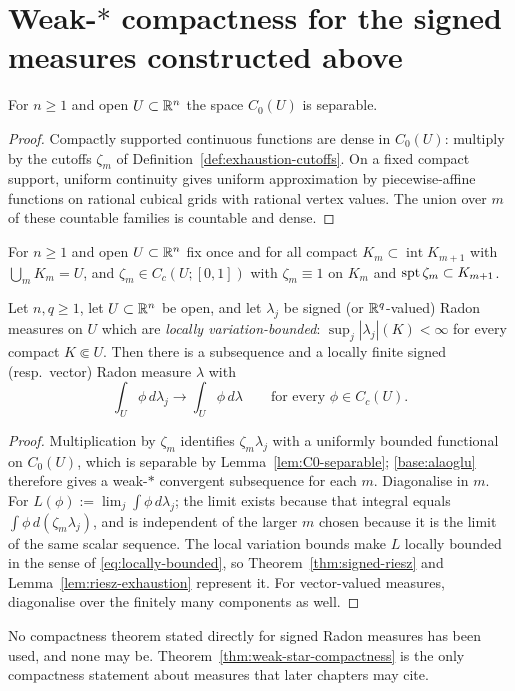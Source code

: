 \section{Weak-$*$ compactness for the signed measures constructed above}
\label{sec:signed-compactness}

\begin{lemma}[$C_0(U)$ is separable]\label{lem:C0-separable}
For $n\ge1$ and open $U\subset\mathbb R^n$ the space $C_0(U)$ is separable.
\end{lemma}

\begin{proof}
Compactly supported continuous functions are dense in $C_0(U)$: multiply by
the cutoffs $\zeta_m$ of Definition~\ref{def:exhaustion-cutoffs}.  On a fixed
compact support, uniform continuity gives uniform approximation by
piecewise-affine functions on rational cubical grids with rational vertex
values.  The union over $m$ of these countable families is countable and
dense.
\end{proof}

\begin{definition}\label{def:exhaustion-cutoffs}
For $n\ge1$ and open $U\subset\mathbb R^n$ fix once and for all compact
$K_m\subset\operatorname{int}K_{m+1}$ with $\bigcup_mK_m=U$, and
$\zeta_m\in C_c(U;[0,1])$ with $\zeta_m\equiv1$ on $K_m$ and
$\operatorname{spt}\zeta_m\subset K_{m+1}$.
\end{definition}

\begin{theorem}\label{thm:weak-star-compactness}
Let $n,q\ge1$, let $U\subset\mathbb R^n$ be open, and let $\lambda_j$ be signed
(or $\mathbb R^q$-valued) Radon measures on $U$ which are
\emph{locally variation-bounded}: $\sup_j|\lambda_j|(K)<\infty$ for every
compact $K\Subset U$.  Then there is a subsequence and a locally finite
signed (resp.\ vector) Radon measure $\lambda$ with
\[
  \int_U\phi\,d\lambda_j\longrightarrow\int_U\phi\,d\lambda
  \qquad\text{for every }\phi\in C_c(U).
\]
\end{theorem}

\begin{proof}
Multiplication by $\zeta_m$ identifies $\zeta_m\lambda_j$ with a uniformly
bounded functional on $C_0(U)$, which is separable by
Lemma~\ref{lem:C0-separable}; \ref{base:alaoglu} therefore gives a
weak-$*$ convergent subsequence for each $m$.  Diagonalise in $m$.  For
$L(\phi):=\lim_j\int\phi\,d\lambda_j$; the limit exists because that integral
equals $\int\phi\,d(\zeta_m\lambda_j)$, and is independent of the larger $m$
chosen because it is the limit of the same scalar sequence.  The local
variation bounds make $L$ locally bounded in the sense of
\eqref{eq:locally-bounded}, so Theorem~\ref{thm:signed-riesz} and
Lemma~\ref{lem:riesz-exhaustion} represent it.  For vector-valued measures,
diagonalise over the finitely many components as well.
\end{proof}

\begin{fnote}\label{fnote:no-signed-compactness}
No compactness theorem stated directly for signed Radon measures has been
used, and none may be.  Theorem~\ref{thm:weak-star-compactness} is the only
compactness statement about measures that later chapters may cite.
\end{fnote}

